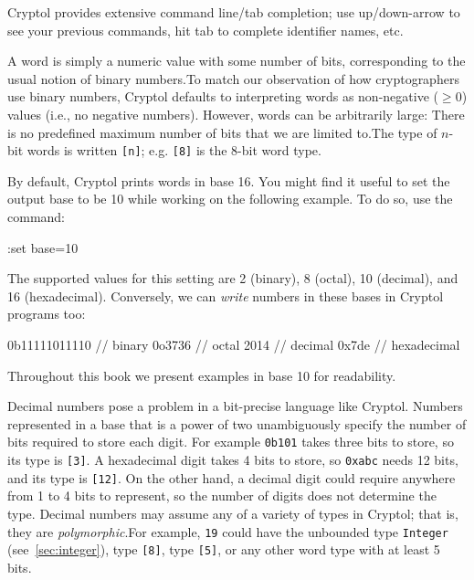 \begin{tip}
  Cryptol provides extensive command line/tab completion; use
  up/down-arrow to see your previous commands, hit tab to complete
  identifier names, etc.
\end{tip}


A word is simply a numeric value with some number of bits,
corresponding to the usual notion of binary numbers.\indTheWordType To
match our observation of how cryptographers use binary numbers,
Cryptol defaults to interpreting words as non-negative ($\geq 0$)
values (i.e., no negative numbers). However, words
can be arbitrarily large: There is no predefined maximum number of
bits that we are limited to.\indArbitraryPrecision The type of $n$-bit
words is written \texttt{[n]}; e.g. \texttt{[8]} is the 8-bit word type.

By default, Cryptol prints words in base 16. You might find it useful
to set the output base to be 10 while working on the following
example. To do so, use the command:\indSettingBase
\restartrepl
\begin{replinVerb}
  :set base=10
\end{replinVerb}
The supported values for this setting are 2 (binary), 8 (octal), 10
(decimal), and 16 (hexadecimal).  Conversely, we can \emph{write}
numbers in these bases in Cryptol programs too:
\begin{replinVerb}
  0b11111011110    // binary
  0o3736           // octal
  2014             // decimal
  0x7de            // hexadecimal
\end{replinVerb}
Throughout this book we present examples in base 10 for readability.

Decimal numbers pose a problem in a bit-precise language like Cryptol.
Numbers represented in a base that is a power of two unambiguously
specify the number of bits required to store each digit. For example
\texttt{0b101} takes three bits to store, so its type is \texttt{[3]}.
A hexadecimal digit takes 4 bits to store, so \texttt{0xabc} needs 12
bits, and its type is \texttt{[12]}. On the other hand, a decimal
digit could require anywhere from 1 to 4 bits to represent, so the
number of digits does not determine the type. Decimal numbers may
assume any of a variety of types in Cryptol; that is, they are
\emph{polymorphic}.\indPolymorphism For example, \texttt{19} could
have the unbounded type \texttt{Integer} (see~\autoref{sec:integer}),
type \texttt{[8]}, type \texttt{[5]}, or any other word type with at
least 5 bits.

